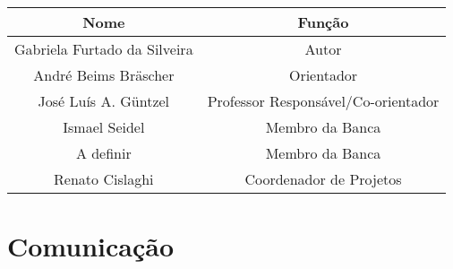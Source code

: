 \begin{tabular}{|c|c|}
	\arrayrulecolor{white}
	\hline
	\arrayrulecolor{black}
	\hline
	\rowcolor{shadecolor}
	Nome                         & Função                              \\ \hline
	Gabriela Furtado da Silveira & Autor                               \\ \hline
	André Beims Bräscher         & Orientador                          \\ \hline
	José Luís A. Güntzel         & Professor Responsável/Co-orientador \\ \hline
	Ismael Seidel                & Membro da Banca                     \\ \hline
	A definir                    & Membro da Banca                     \\ \hline
	Renato Cislaghi              & Coordenador de Projetos             \\ \hline

\end{tabular}


\section{Comunicação}


